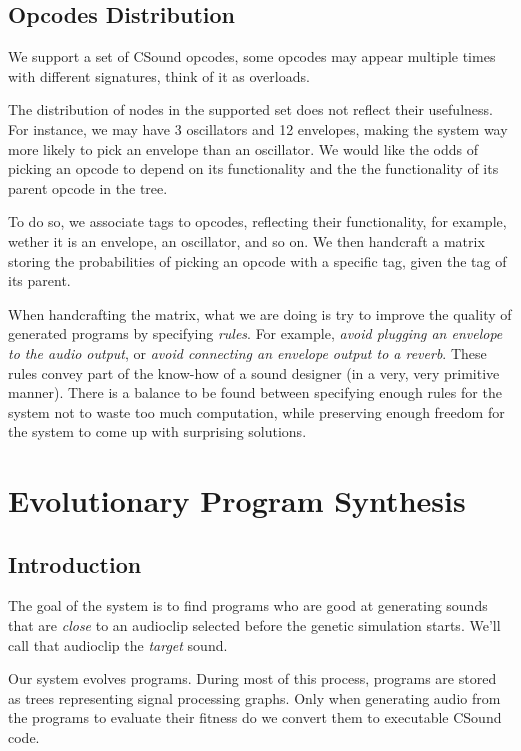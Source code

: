 \documentclass{article}
\begin{document}
\subsection{Opcodes Distribution}\label{distribution}

We support a set of CSound opcodes, some opcodes may appear multiple times with different signatures, think of it as overloads.

The distribution of nodes in the supported set does not reflect their usefulness. For instance, we may have 3 oscillators and 12 envelopes, making the system way more likely to pick an envelope than an oscillator.
We would like the odds of picking an opcode to depend on its functionality and the the functionality of its parent opcode in the tree.

To do so, we associate tags to opcodes, reflecting their functionality, for example, wether it is an envelope, an oscillator, and so on. We then handcraft a matrix storing the probabilities of picking an opcode with a specific tag, given the tag of its parent.

When handcrafting the matrix, what we are doing is try to improve the quality of generated programs by specifying \textit{rules}. For example, \textit{avoid plugging an envelope to the audio output}, or \textit{avoid connecting an envelope output to a reverb}. These rules convey part of the know-how of a sound designer (in a very, very primitive manner). There is a balance to be found between specifying enough rules for the system not to waste too much computation, while preserving enough freedom for the system to come up with surprising solutions.

\section{Evolutionary Program Synthesis}

\subsection{Introduction}\label{introduction}

The goal of the system is to find programs who are good at generating sounds that are \textit{close} to an audioclip selected before the genetic simulation starts. We'll call that audioclip the \textit{target} sound.

Our system evolves programs. During most of this process, programs are stored as trees representing signal processing graphs. Only when generating audio from the programs to evaluate their fitness do we convert them to executable CSound code.
\end{document}
